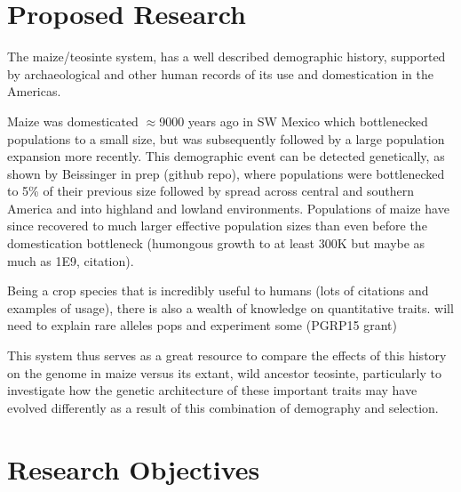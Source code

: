 \documentclass[10pt, letterpaper]{article}
\begin{document}
\section*{Proposed Research}
	
The maize/teosinte system, has a well described demographic history, supported by archaeological and other human records of its use and domestication in the Americas.

Maize was domesticated $\approx$9000 years ago in SW Mexico which bottlenecked populations to a small size, but was subsequently followed by a large population expansion more recently. This demographic event can be detected genetically, as shown by Beissinger in prep (github repo), where populations were bottlenecked to 5\% of their previous size followed by spread across central and southern America and into highland and lowland environments. Populations of maize have since recovered to much larger effective population sizes than even before the domestication bottleneck (humongous growth to at least 300K but maybe as much as 1E9, citation).

Being a crop species that is incredibly useful to humans (lots of citations and examples of usage), there is also a wealth of knowledge on quantitative traits. 
will need to explain rare alleles pops and experiment some (PGRP15 grant)

This system thus serves as a great resource to compare the effects of this history on the genome in maize versus its extant, wild ancestor teosinte, particularly to investigate how the genetic architecture of these important traits may have evolved differently as a result of this combination of demography and selection.




\section*{Research Objectives}
\end{document}
